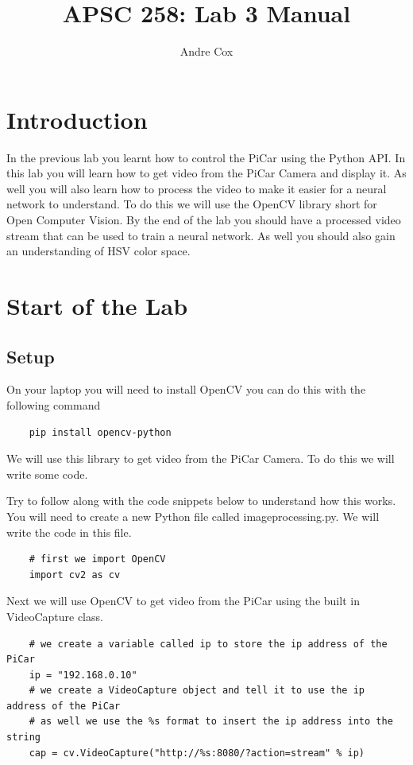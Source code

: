 \documentclass[11pt]{report}
\title{APSC 258: Lab 3 Manual}
\author{Andre Cox}
\begin{document}
\maketitle
\tableofcontents

\clearpage

\chapter{Introduction}
In the previous lab you learnt how to control the PiCar using the Python API. In this lab you will learn how to get video from the PiCar Camera and display it. As well you will also learn how to process the video to make it easier for a neural network to understand. To do this we will use the OpenCV library short for Open Computer Vision. By the end of the lab you should have a processed video stream that can be used to train a neural network. As well you should also gain an understanding of HSV color space.

\chapter{Start of the Lab}
\section{Setup}
On your laptop you will need to install OpenCV you can do this with the following command
\begin{verbatim}
    pip install opencv-python  
\end{verbatim}

We will use this library to get video from the PiCar Camera. To do this we will write some code.

Try to follow along with the code snippets below to understand how this works. You will need to create a new Python file called imageprocessing.py. We will write the code in this file.

\begin{verbatim}
    # first we import OpenCV 
    import cv2 as cv 
\end{verbatim}

Next we will use OpenCV to get video from the PiCar using the built in VideoCapture class.
\begin{verbatim}
    # we create a variable called ip to store the ip address of the PiCar
    ip = "192.168.0.10"
    # we create a VideoCapture object and tell it to use the ip address of the PiCar
    # as well we use the %s format to insert the ip address into the string
    cap = cv.VideoCapture("http://%s:8080/?action=stream" % ip)
\end{verbatim}
\end{document}
